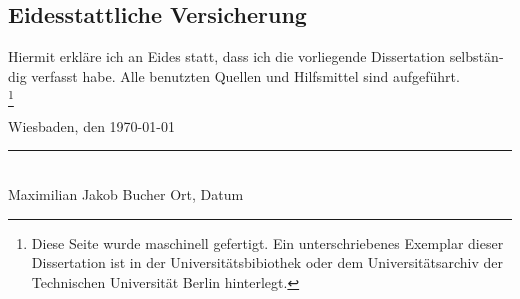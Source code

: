 %
\newcommand\blfootnote[1]{%
	\begingroup
	\renewcommand\thefootnote{}\footnote{#1}
	\addtocounter{footnote}{-1}
	\endgroup
	}
%
%
%
\begin{otherlanguage}{german}
%
\chapter{Eidesstattliche Versicherung}
Hiermit erkläre ich an Eides statt, dass ich die vorliegende Dissertation selbständig verfasst habe. Alle benutzten Quellen und Hilfsmittel sind aufgeführt.\\

\blfootnote{Diese Seite wurde maschinell gefertigt. Ein unterschriebenes Exemplar dieser Dissertation ist in der Universitätsbibiothek oder dem Universitätsarchiv der Technischen Universität Berlin hinterlegt.}
%
\hspace{8cm}Wiesbaden, den \today\\
\hspace{2.5cm}\rule{15cm}{0.4pt}\\
\hspace{2.5cm}Maximilian Jakob Bucher
\hspace{8cm}Ort, Datum\\
%
\end{otherlanguage}